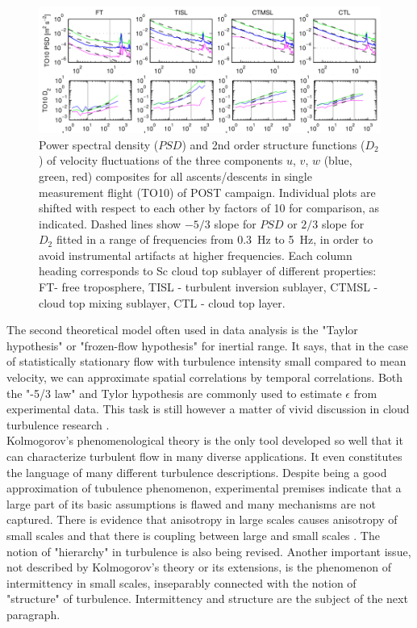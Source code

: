 \documentclass[../main.tex]{subfiles}
\begin{document}
\begin{figure}
\centering
\noindent \includegraphics[width=30pc]{gfx/POST_spectra_struct.png}
\caption{Power spectral density ($PSD$) and 2nd order structure functions ($D_2$) of velocity fluctuations of the three components $u$, $v$, $w$ (blue, green, red) composites for all ascents/descents in single measurement flight (TO10) of POST campaign. Individual plots are shifted with respect to each other by factors of 10 for comparison, as indicated. Dashed lines show $-5/3$ slope for $PSD$ or $2/3$ slope for $D_2$ fitted in a range of frequencies from 0.3~Hz to 5~Hz, in order to avoid instrumental artifacts at higher frequencies. Each column heading corresponds to Sc cloud top sublayer of different properties: FT- free troposphere, TISL - turbulent inversion sublayer, CTMSL - cloud top mixing sublayer, CTL - cloud top layer.}
\label{fig:ch1_02}
\end{figure}
The second theoretical model often used in data analysis is the "Taylor hypothesis" or "frozen-flow hypothesis" for inertial range. It says, that in the case of statistically stationary flow with turbulence intensity small compared to mean velocity, we can approximate spatial correlations by temporal correlations. Both the "-5/3 law" and Tylor hypothesis are commonly used to estimate $\epsilon$ from experimental data. This task is still however a matter of vivid discussion in cloud turbulence research \citep{Waclawczyk2017, Zilitinkevich2019}.\\
Kolmogorov's phenomenological theory is the only tool  developed so well that it can characterize turbulent flow in many diverse applications. It even constitutes the language of many different turbulence descriptions. Despite being a good approximation of tubulence phenomenon, experimental premises indicate that a large part of its basic assumptions is flawed and many mechanisms are not captured. There is evidence that anisotropy in large scales causes anisotropy of small scales and that there is coupling between large and small scales \citep{Warhaft2000}. The notion of "hierarchy" in turbulence is also being revised. Another important issue, not described by Kolmogorov's theory or its extensions, is the phenomenon of intermittency in small scales, inseparably connected with the notion of "structure" of turbulence. Intermittency and structure are the subject of the next paragraph.
\end{document}
